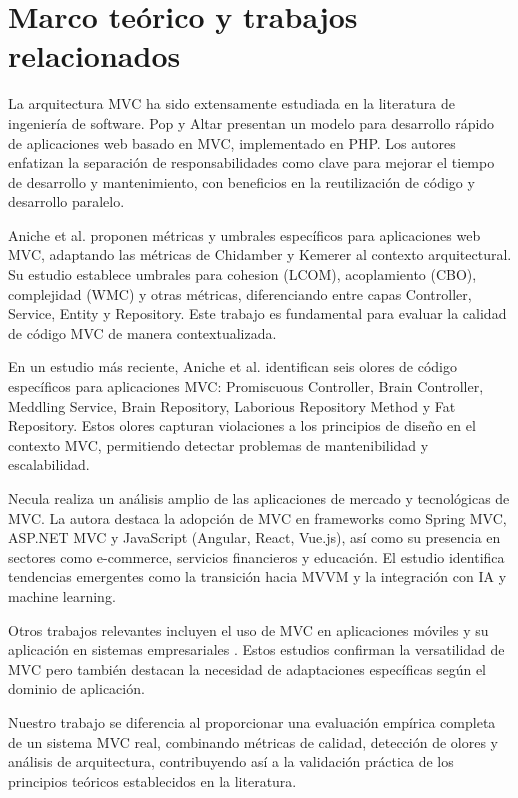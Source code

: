 \section{Marco teórico y trabajos relacionados}

La arquitectura MVC ha sido extensamente estudiada en la literatura de ingeniería de software. Pop y Altar \cite{pop2014designing} presentan un modelo para desarrollo rápido de aplicaciones web basado en MVC, implementado en PHP. Los autores enfatizan la separación de responsabilidades como clave para mejorar el tiempo de desarrollo y mantenimiento, con beneficios en la reutilización de código y desarrollo paralelo.

Aniche et al. \cite{aniche2016satt} proponen métricas y umbrales específicos para aplicaciones web MVC, adaptando las métricas de Chidamber y Kemerer al contexto arquitectural. Su estudio establece umbrales para cohesion (LCOM), acoplamiento (CBO), complejidad (WMC) y otras métricas, diferenciando entre capas Controller, Service, Entity y Repository. Este trabajo es fundamental para evaluar la calidad de código MVC de manera contextualizada.

En un estudio más reciente, Aniche et al. \cite{aniche2018code} identifican seis olores de código específicos para aplicaciones MVC: Promiscuous Controller, Brain Controller, Meddling Service, Brain Repository, Laborious Repository Method y Fat Repository. Estos olores capturan violaciones a los principios de diseño en el contexto MVC, permitiendo detectar problemas de mantenibilidad y escalabilidad.

Necula \cite{necula2024exploring} realiza un análisis amplio de las aplicaciones de mercado y tecnológicas de MVC. La autora destaca la adopción de MVC en frameworks como Spring MVC, ASP.NET MVC y JavaScript (Angular, React, Vue.js), así como su presencia en sectores como e-commerce, servicios financieros y educación. El estudio identifica tendencias emergentes como la transición hacia MVVM y la integración con IA y machine learning.

Otros trabajos relevantes incluyen el uso de MVC en aplicaciones móviles \cite{narsoo2009application} y su aplicación en sistemas empresariales \cite{zhao2010design}. Estos estudios confirman la versatilidad de MVC pero también destacan la necesidad de adaptaciones específicas según el dominio de aplicación.

Nuestro trabajo se diferencia al proporcionar una evaluación empírica completa de un sistema MVC real, combinando métricas de calidad, detección de olores y análisis de arquitectura, contribuyendo así a la validación práctica de los principios teóricos establecidos en la literatura.